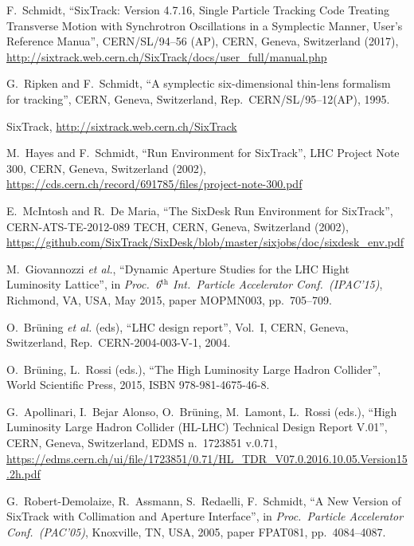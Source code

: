 \begin{thebibliography}{99}
  
  F.~Schmidt, ``SixTrack: Version 4.7.16, Single Particle
  Tracking Code Treating Transverse Motion with Synchrotron
  Oscillations in a Symplectic Manner, User's Reference Manua'',
  CERN/SL/94--56 (AP), CERN, Geneva, Switzerland (2017),
  \url{http://sixtrack.web.cern.ch/SixTrack/docs/user_full/manual.php}
  
    G.~Ripken and F.~Schmidt,
    ``A symplectic six-dimensional thin-lens formalism for tracking'',
    CERN, Geneva, Switzerland, Rep.~CERN/SL/95--12(AP), 1995.

 SixTrack, \url{http://sixtrack.web.cern.ch/SixTrack}

  M.~Hayes and F.~Schmidt, ``Run Environment for SixTrack'',
  LHC Project Note 300, CERN, Geneva, Switzerland (2002),
  \url{https://cds.cern.ch/record/691785/files/project-note-300.pdf}

  E.~McIntosh and R.~De Maria, ``The SixDesk Run Environment for SixTrack'',
  CERN-ATS-TE-2012-089 TECH, CERN, Geneva, Switzerland (2002),
  \url{https://github.com/SixTrack/SixDesk/blob/master/sixjobs/doc/sixdesk_env.pdf}

  M.~Giovannozzi \emph{et al.},
  ``Dynamic Aperture Studies for the LHC Hight Luminosity Lattice'',
  in \emph{Proc.~6$^{\textrm{th}}$ Int.~Particle Accelerator Conf.~(IPAC'15)},
  Richmond, VA, USA, May 2015, paper MOPMN003, 
  pp.~705--709.
  
  O.~Br\"{u}ning \emph{et al.} (eds), ``LHC design report'', Vol.~I,
  CERN, Geneva, Switzerland, Rep.~CERN-2004-003-V-1, 2004.
  
  O.~Br\"{u}ning, L.~Rossi (eds.),
  ``The High Luminosity Large Hadron Collider'',
  World Scientific Press, 2015, ISBN 978-981-4675-46-8.
  
  G.~Apollinari, I.~Bejar Alonso, O.~Br\"{u}ning, M.~Lamont, L.~Rossi (eds.),
  ``High Luminosity Large Hadron Collider (HL-LHC) Technical Design Report
  V.01'', CERN, Geneva, Switzerland, EDMS n.~1723851 v.0.71,
  \url{https://edms.cern.ch/ui/file/1723851/0.71/HL_TDR_V07.0.2016.10.05.Version15.2h.pdf}
  
  G.~Robert-Demolaize, R.~Assmann, S.~Redaelli, F.~Schmidt,
  ``A New Version of SixTrack with Collimation and Aperture Interface'',
  in \emph{Proc.~Particle Accelerator Conf.~(PAC'05)}, 
  Knoxville, TN, USA, 2005, paper FPAT081,
  pp.~4084--4087.
    

\end{thebibliography}
